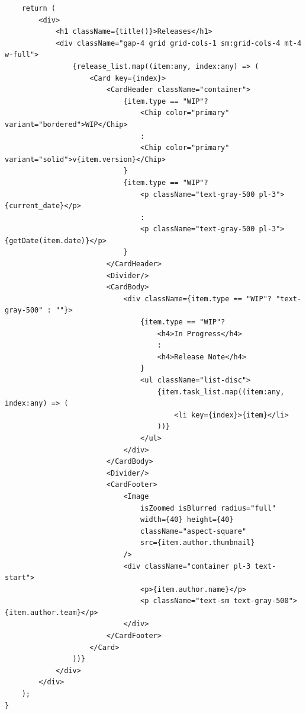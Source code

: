 \documentclass[master, och, diploma]{SCWorks}
\begin{document}
\begin{verbatim}
    return (
        <div>
            <h1 className={title()}>Releases</h1>
            <div className="gap-4 grid grid-cols-1 sm:grid-cols-4 mt-4 w-full">
                {release_list.map((item:any, index:any) => (
                    <Card key={index}>
                        <CardHeader className="container">
                            {item.type == "WIP"?
                                <Chip color="primary" variant="bordered">WIP</Chip>
                                :
                                <Chip color="primary" variant="solid">v{item.version}</Chip>
                            }
                            {item.type == "WIP"?
                                <p className="text-gray-500 pl-3">{current_date}</p>
                                :
                                <p className="text-gray-500 pl-3">{getDate(item.date)}</p>
                            }
                        </CardHeader>
                        <Divider/>
                        <CardBody>
                            <div className={item.type == "WIP"? "text-gray-500" : ""}>
                                {item.type == "WIP"?
                                    <h4>In Progress</h4>
                                    :
                                    <h4>Release Note</h4>
                                }
                                <ul className="list-disc">
                                    {item.task_list.map((item:any, index:any) => (
                                        <li key={index}>{item}</li>
                                    ))}
                                </ul>
                            </div>
                        </CardBody>
                        <Divider/>
                        <CardFooter>
                            <Image
                                isZoomed isBlurred radius="full"
                                width={40} height={40}
                                className="aspect-square"
                                src={item.author.thumbnail}
                            />
                            <div className="container pl-3 text-start">
                                <p>{item.author.name}</p>
                                <p className="text-sm text-gray-500">{item.author.team}</p>
                            </div>
                        </CardFooter>
                    </Card>
                ))}
            </div>
        </div>
    );
}

\end{verbatim}
\end{document}
